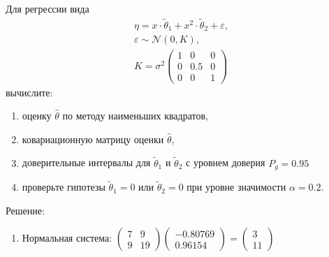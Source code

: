 \documentclass[a4paper,12pt]{article}
\begin{document}
\begin{enumerate}
            Для регрессии вида
            \begin{gather*}
                  \eta = x \cdot \widetilde{\theta}_1 + x^2 \cdot \widetilde{\theta}_2 + \varepsilon , \\
                  \varepsilon \sim \mathcal{N} ( 0, K ), \\
                  K =
                  \sigma^2
                  \begin{pmatrix}
                        1 & 0   & 0 \\
                        0 & 0.5 & 0 \\
                        0 & 0   & 1
                  \end{pmatrix}
            \end{gather*}
            вычислите:
            \begin{enumerate}
                  \item оценку $\widehat{\theta}$ по методу наименьших квадратов,
                  \item ковариационную матрицу оценки $\widehat{\theta}$,
                  \item доверительные интервалы для $\widetilde{\theta}_1$ и $\widetilde{\theta}_2$ с уровнем доверия $P_g = 0.95$
                  \item проверьте гипотезы $\widetilde{\theta}_1 = 0$ или $\widetilde{\theta}_2 = 0$ при уровне значимости $\alpha = 0.2$.
            \end{enumerate}

            Решение:
            \begin{enumerate}
                  \item Нормальная система:
                        $
                              \begin{pmatrix}
                                    7 & 9  \\
                                    9 & 19
                              \end{pmatrix}
                              \begin{pmatrix}
                                    -0.80769 \\
                                    0.96154
                              \end{pmatrix}
                              =
                              \begin{pmatrix}
                                    3 \\
                                    11
                              \end{pmatrix}
                        $


\end{enumerate}
\end{enumerate}
\end{document}
